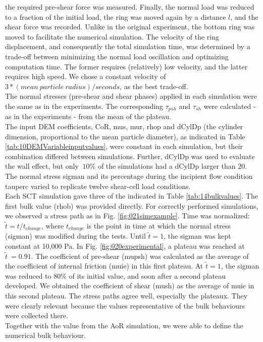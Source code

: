 the required pre-shear force was measured.
Finally, the normal load was reduced to a fraction of the initial load, 
the ring was moved again by a distance $l$, and the shear force was recorded. 
Unlike in the original experiment, the bottom ring was moved to facilitate the numerical simulation. 
The velocity of the ring displacement, and consequently the total simulation time, 
was determined by a trade-off between minimizing the normal load oscillation and
optimizing computation time. 
The former requires (relatively) low velocity, and the latter requires high
speed.
We chose a constant velocity of $3*(mean ~ particle ~ radius)/seconds$, as the
best trade-off.\\
The normal stresses (pre-shear and shear phases) applied in each simulation were
the same as in the experiments.
The corresponding $\tau_{psh}$ and $\tau_{sh}$ were calculated - as in the experiments - from the mean of the plateau.\\
The input \acs{DEM} coefficients, \acs{CoR}, \acs{mus}, \acs{mur},
\acs{rhop} and \acs{dCylDp} (the cylinder dimension, proportional to the mean
particle diameter), as indicated in Table \ref{tab:10DEMVariableinputvalues}, 
were constant in each simulation, but their combination differed between
simulations.
Further, \acs{dCylDp} was used to evaluate the wall effect, but only $~10\%$ of the
simulations had a \acs{dCylDp} larger than $20$.
The normal stress \acs{sigman} and its
percentage during the incipient flow condition \acs{tauperc}
varied to replicate twelve shear-cell load conditions.\\ 

Each \acs{SCT} simulation gave three of the  indicated in
Table \ref{tab:14bulkvalues}.
The first bulk value (\acs{rhob}) was provided directly. 
For correctly performed simulations, we
observed a stress path as in Fig. \ref{fig:021simexample}.
Time was normalized: $\tilde{t} = t/t_{change}$, where $t_{change}$ is the
point in time at which the normal stress (\acs{sigman}) was modified during the
tests.
Until $\tilde{t}=1$, the \acs{sigman} was kept constant at 10,000 Pa.
In Fig. \ref{fig:020experimental},
a plateau was reached at $\tilde{t}~=0.91$.
The coefficient of pre-shear (\acs{mupsh}) was calculated as the average of the
coefficient of internal friction (\acs{muie}) in this first plateau.
At $\tilde{t}=1$, the \acs{sigman} was reduced to $80 \%$ of its initial
value, and soon after
a second plateau developed.
We obtained the coefficient of
shear (\acs{mush}) as the average of \acs{muie} in this second plateau.
The stress paths agree well, especially the plateaux.
They were clearly relevant because
the values representative of the bulk behaviours
were collected there.\\
Together with the value from the \acs{AoR} simulation, we were able to define
the numerical bulk behaviour.